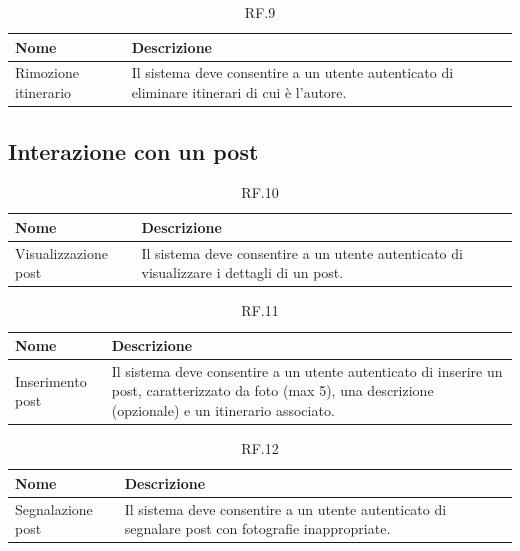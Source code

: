 \documentclass{natourDoc}
\begin{document}
	\begin{table}[H]
		\centering
		\begin{tabular}{ |p{5cm}|p{10.3cm}| }
			\hline
			\rowcolor{PineGreen!70}
			\textbf{Nome} & \textbf{Descrizione} \\
			\hline
			Rimozione itinerario & Il sistema deve consentire a un utente autenticato di eliminare itinerari di cui
			è l'autore. \\
			\hline
		\end{tabular}
		\caption{RF.9}
		\label{table:9}
	\end{table}
	
	\subsection{Interazione con un post}
	\begin{table}[H]
		\centering
		\begin{tabular}{ |p{5cm}|p{10.3cm}| }
			\hline
			\rowcolor{PineGreen!70}
			\textbf{Nome} & \textbf{Descrizione} \\
			\hline
			Visualizzazione post & Il sistema deve consentire a un utente autenticato di visualizzare
			i dettagli di un post. \\
			\hline
		\end{tabular}
		\caption{RF.10}
		\label{table:10}
	\end{table}

	\begin{table}[H]
		\centering
		\begin{tabular}{ |p{5cm}|p{10.3cm}| } 
			\hline
			\rowcolor{PineGreen!70}
			\textbf{Nome} & \textbf{Descrizione} \\
			\hline
			Inserimento post &  Il sistema deve consentire a un utente autenticato di inserire un post, 
			caratterizzato da foto (max 5), una descrizione (opzionale) e un itinerario associato. \\
			\hline
		\end{tabular}
		\caption{RF.11}
		\label{table:11}
	\end{table}
	
	
	\begin{table}[H]
		\centering
		\begin{tabular}{ |p{5cm}|p{10.3cm}| }
			\hline
			\rowcolor{PineGreen!70}
			\textbf{Nome} & \textbf{Descrizione} \\
			\hline
			Segnalazione post & Il sistema deve consentire a un utente autenticato di segnalare post con fotografie
			inappropriate. \\
			\hline
		\end{tabular}
		\caption{RF.12}
		\label{table:12}
	\end{table}
\end{document}
